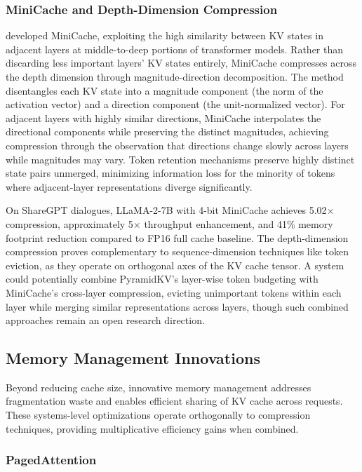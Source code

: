 \documentclass[11pt,letterpaper]{article}
\begin{document}
\subsubsection{MiniCache and Depth-Dimension Compression}

\cite{jia2024minicache} developed MiniCache, exploiting the high similarity between KV states in adjacent layers at middle-to-deep portions of transformer models. Rather than discarding less important layers' KV states entirely, MiniCache compresses across the depth dimension through magnitude-direction decomposition. The method disentangles each KV state into a magnitude component (the norm of the activation vector) and a direction component (the unit-normalized vector). For adjacent layers with highly similar directions, MiniCache interpolates the directional components while preserving the distinct magnitudes, achieving compression through the observation that directions change slowly across layers while magnitudes may vary. Token retention mechanisms preserve highly distinct state pairs unmerged, minimizing information loss for the minority of tokens where adjacent-layer representations diverge significantly.

On ShareGPT dialogues, LLaMA-2-7B with 4-bit MiniCache achieves 5.02$\times$ compression, approximately 5$\times$ throughput enhancement, and 41\% memory footprint reduction compared to FP16 full cache baseline. The depth-dimension compression proves complementary to sequence-dimension techniques like token eviction, as they operate on orthogonal axes of the KV cache tensor. A system could potentially combine PyramidKV's layer-wise token budgeting with MiniCache's cross-layer compression, evicting unimportant tokens within each layer while merging similar representations across layers, though such combined approaches remain an open research direction.

\subsection{Memory Management Innovations}

Beyond reducing cache size, innovative memory management addresses fragmentation waste and enables efficient sharing of KV cache across requests. These systems-level optimizations operate orthogonally to compression techniques, providing multiplicative efficiency gains when combined.

\subsubsection{PagedAttention}
\end{document}

